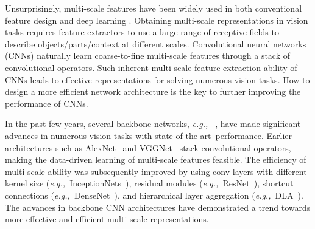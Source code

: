 \documentclass[10pt,journal,cspaper,compsoc]{IEEEtran}
\newcommand{\figref}[1]{Figure 1}%
\newcommand{\figref}[1]{Fig.~\ref{#1}}%
\newcommand{\sArt}{{state-of-the-art~}}
\def\eg{\emph{e.g.,~}}
\begin{document}
Unsurprisingly, multi-scale features have been widely used in 
both conventional feature design 
\cite{belongie2002shape,lowe2004distinctive}
and deep learning
\cite{szegedy2015going,chen2017dual}.
%
Obtaining multi-scale representations in vision tasks
requires feature extractors to use a large range of receptive fields
to describe objects/parts/context at different scales.
%
Convolutional neural networks (CNNs) naturally learn coarse-to-fine
multi-scale features through a stack of convolutional operators.
%
Such inherent multi-scale feature extraction ability of CNNs
leads to effective representations for solving numerous vision tasks.
%
How to design a more efficient network architecture is the key to further
improving the performance of CNNs.

In the past few years, several backbone networks, \eg
\cite{krizhevsky2012imagenet,simonyan2014very,szegedy2015going,he2016deep,
huang2017densely,Chollet_2017_CVPR,xie2017aggregated,chen2017dual,
yu2018deep,hu2018senet},
have made significant advances in numerous vision tasks with 
\sArt performance.
%
%
Earlier architectures such as AlexNet~\cite{krizhevsky2012imagenet} and
VGGNet~\cite{simonyan2014very} stack convolutional operators, 
making the data-driven learning of multi-scale features feasible.
%
The efficiency of multi-scale ability was subsequently improved by
using conv layers with different kernel size
(\eg InceptionNets~\cite{szegedy2015going,szegedy2016rethinking,
szegedy2017inception}),
%
residual modules (\eg ResNet~\cite{he2016deep}),
shortcut connections (\eg DenseNet~\cite{huang2017densely}),
%
and hierarchical layer aggregation (\eg DLA~\cite{yu2018deep}).
%
The advances in backbone CNN architectures have demonstrated
a trend towards more effective and efficient multi-scale representations.
\end{document}
